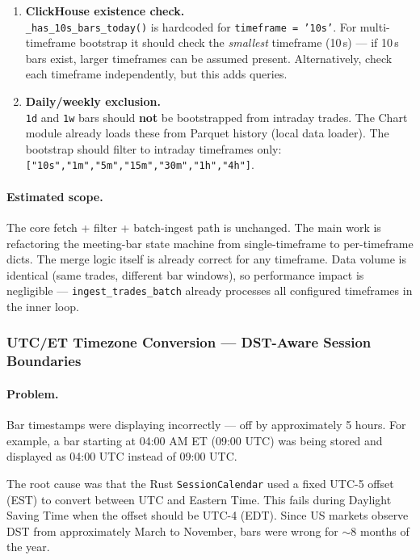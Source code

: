 \documentclass[a4paper, 11pt]{article}
\begin{document}
\begin{enumerate}
    \item \textbf{ClickHouse existence check.} \\
    \texttt{\_has\_10s\_bars\_today()} is hardcoded for \texttt{timeframe = '10s'}.
    For multi-timeframe bootstrap it should check the \emph{smallest} timeframe
    (10\,s) --- if 10\,s bars exist, larger timeframes can be assumed present.
    Alternatively, check each timeframe independently, but this adds queries.

    \item \textbf{Daily/weekly exclusion.} \\
    \texttt{1d} and \texttt{1w} bars should \textbf{not} be bootstrapped from intraday
    trades.  The Chart module already loads these from Parquet history
    (local data loader).  The bootstrap should filter to intraday timeframes only:
    \texttt{["10s","1m","5m","15m","30m","1h","4h"]}.
\end{enumerate}

\paragraph{Estimated scope.}
The core fetch + filter + batch-ingest path is unchanged.  The main work is
refactoring the meeting-bar state machine from single-timeframe to per-timeframe
dicts.  The merge logic itself is already correct for any timeframe.
Data volume is identical (same trades, different bar windows), so performance
impact is negligible --- \texttt{ingest\_trades\_batch} already processes all
configured timeframes in the inner loop.


\pagebreak


\subsubsection{UTC/ET Timezone Conversion --- DST-Aware Session Boundaries}
\label{sec:utc-et-timezone}

\paragraph{Problem.}
Bar timestamps were displaying incorrectly --- off by approximately 5 hours.
For example, a bar starting at 04:00 AM ET (09:00 UTC) was being stored and
displayed as 04:00 UTC instead of 09:00 UTC.

The root cause was that the Rust \texttt{SessionCalendar} used a fixed UTC-5
offset (EST) to convert between UTC and Eastern Time.  This fails during
Daylight Saving Time when the offset should be UTC-4 (EDT).  Since US markets
observe DST from approximately March to November, bars were wrong for $\sim$8
months of the year.
\end{document}
